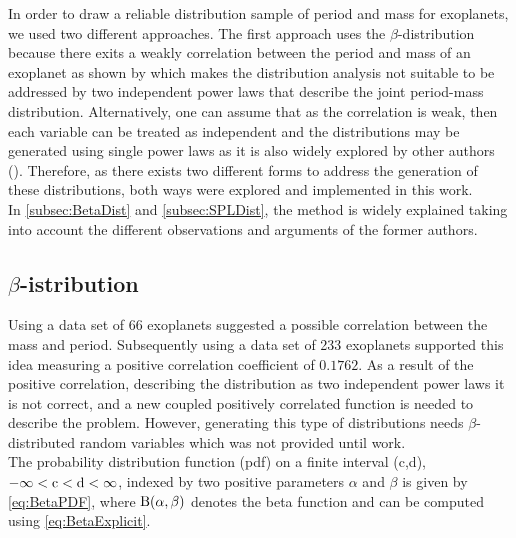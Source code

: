 In order to draw a reliable distribution sample of period and mass for exoplanets, we used two different approaches. The first approach uses the $\beta$-distribution because there exits a weakly correlation between the period and mass of an exoplanet as shown by \citeyear{2002ApJ...568L.113Z} which makes the distribution analysis not suitable to be addressed by two independent power laws that describe the joint period-mass distribution. Alternatively, one can assume that as the correlation is weak, then each variable can be treated as independent and the distributions may be generated using single power laws as it is also widely explored by other authors (\citeyear{2010EAS....41..107N}). Therefore, as there exists two different forms to address the generation of these distributions, both ways were explored and implemented in this work.\\

In \autoref{subsec:BetaDist} and \autoref{subsec:SPLDist}, the method is widely explained taking into account the different observations and arguments of the former authors. 

\subsection{\texorpdfstring{$\beta$-}Distribution}\label{subsec:BetaDist}

Using a data set of 66 exoplanets \citeyear{2002ApJ...568L.113Z} suggested a possible correlation between the mass and period. Subsequently \citeyear{1538-3881-134-5-2061} using a data set of 233 exoplanets supported this idea measuring a positive correlation coefficient of $0.1762$. As a result of the positive correlation, describing the distribution as two independent power laws it is not correct, and a new coupled positively correlated function is needed to describe the problem. However, generating this type of distributions needs $\beta$-distributed random variables which was not provided until \citeyear{2004CMS...46.397M} work.\\

The probability distribution function (pdf) on a finite interval (c,d), $-\infty < \textnormal{c} < \textnormal{d} < \infty $, indexed by two positive parameters $\alpha$ and $\beta$ is given by \autoref{eq:BetaPDF}, where $\textnormal{B}(\alpha, \beta)$ denotes the beta function and can be computed using \autoref{eq:BetaExplicit}.\\


